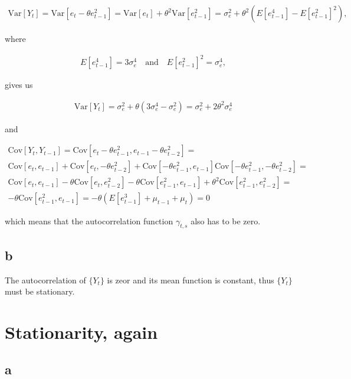 \documentclass[]{book}
\theoremstyle{definition}
\theoremstyle{definition}
\theoremstyle{remark}
\begin{document}
\begin{gather*}
  \text{Var}[Y_t] = \text{Var}[e_t-\theta e_{t-1}^2] = \text{Var}[e_t] + \theta^2 \text{Var}[e_{t-1}^2] = \sigma_e^2 + \theta^2 (E[e_{t-1}^4] - E[e_{t-1}^2]^2),
\end{gather*}

where

\begin{gather*}
  E[e_{t-1}^4] = 3\sigma_e^4 \quad \text{and} \quad E[e_{t-1}^2 ]^2 = \sigma_e^4,
\end{gather*}

gives us

\begin{gather*}
  \text{Var}[Y_t] = \sigma_e^2 + \theta(3\sigma_e^4 - \sigma_e^2) = \sigma_e^2 + 2 \theta^2 \sigma_e^4
\end{gather*}

and

\begin{gather*}
  \text{Cov}[Y_t, Y_{t-1}] = \text{Cov}[e_t - \theta e_{t-1}^2, e_{t-1} - \theta e_{t-2}^2] = \\
  \text{Cov}[e_t, e_{t-1}] + \text{Cov}[e_t, - \theta e_{t-2}^2] + \text{Cov}[- \theta e_{t-1}^2, e_{t-1}]
    \text{Cov}[-\theta e_{t-1}^2, - \theta e_{t-2}^2] =\\
  \text{Cov}[e_t, e_{t-1}] - \theta \text{Cov}[e_t, e_{t-2}^2] - \theta \text{Cov}[e_{t-1}^2, e_{t-1}] +
    \theta^2 \text{Cov}[e_{t-1}^2, e_{t-2}^2] = \\
  -\theta \text{Cov}[e_{t-1}^2, e_{t-1}] = -\theta (E[e_{t-1}^3] + \mu_{t-1} + \mu_t) = 0
\end{gather*}

which means that the autocorrelation function \(\gamma_{t,s}\) also has
to be zero.

\subsection*{b}\label{b-9}

The autocorrelation of \(\{Y_t\}\) is zeor and its mean function is
constant, thus \(\{Y_t\}\) must be stationary.

\section{Stationarity, again}\label{stationarity-again}

\subsection*{a}\label{a-10}
\end{document}
